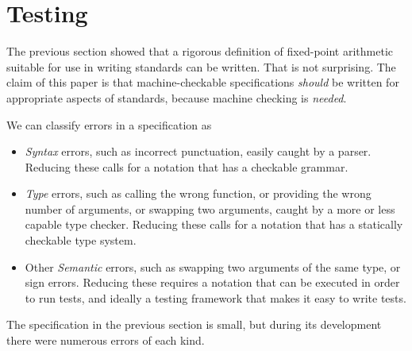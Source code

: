 \documentclass{article}
\begin{document}
\section{Testing}

The previous section showed that a rigorous definition
of fixed-point arithmetic suitable for use in writing
standards can be written.  That is not surprising.  The
claim of this paper is that machine-checkable specifications
{\it should} be written for appropriate aspects of standards,
because machine checking is {\it needed}.

We can classify errors in a specification as
\begin{itemize}
\item {\it Syntax} errors, such as incorrect punctuation,
easily caught by a parser.  Reducing these calls for a
notation that has a checkable grammar.
\item {\it Type} errors, such as calling the wrong function,
or providing the wrong number of arguments, or swapping two
arguments, caught by a more or less capable type checker.
Reducing these calls for a notation that has a statically
checkable type system.
\item Other {\it Semantic} errors, such as swapping two
arguments of the same type, or sign errors.
Reducing these requires a notation that can be executed
in order to run tests, and ideally a testing framework
that makes it easy to write tests.
\end{itemize}

The specification in the previous section is small, but
during its development there were numerous errors of each kind.
\end{document}

